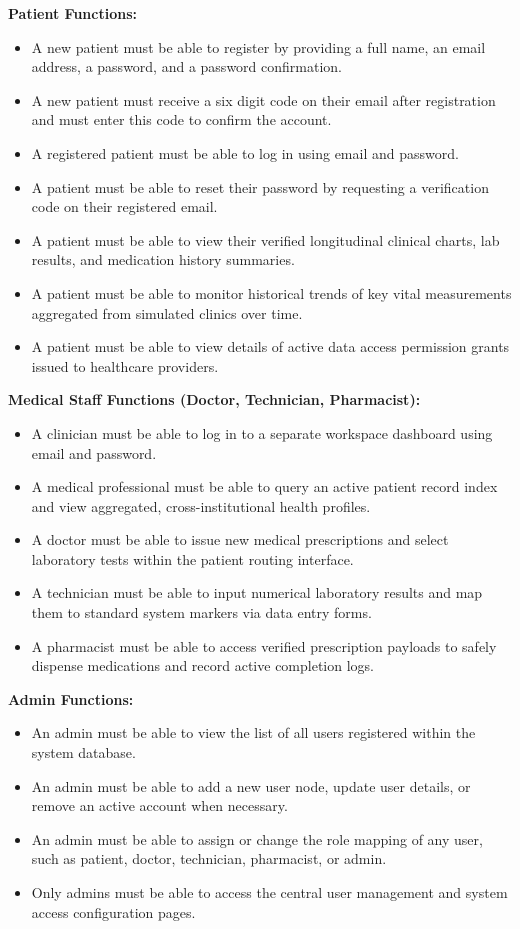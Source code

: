 \documentclass[12pt, a4paper]{report}
\numberwithin{equation}{chapter}
\begin{document}
\noindent \textbf{Patient Functions:}
\begin{itemize}
    \item A new patient must be able to register by providing a full name, an email address, a password, and a password confirmation.
    \item A new patient must receive a six digit code on their email after registration and must enter this code to confirm the account.
    \item A registered patient must be able to log in using email and password.
    \item A patient must be able to reset their password by requesting a verification code on their registered email.
    \item A patient must be able to view their verified longitudinal clinical charts, lab results, and medication history summaries.
    \item A patient must be able to monitor historical trends of key vital measurements aggregated from simulated clinics over time.
    \item A patient must be able to view details of active data access permission grants issued to healthcare providers.
\end{itemize}

\noindent \textbf{Medical Staff Functions (Doctor, Technician, Pharmacist):}
\begin{itemize}
    \item A clinician must be able to log in to a separate workspace dashboard using email and password.
    \item A medical professional must be able to query an active patient record index and view aggregated, cross-institutional health profiles.
    \item A doctor must be able to issue new medical prescriptions and select laboratory tests within the patient routing interface.
    \item A technician must be able to input numerical laboratory results and map them to standard system markers via data entry forms.
    \item A pharmacist must be able to access verified prescription payloads to safely dispense medications and record active completion logs.
\end{itemize}

\noindent \textbf{Admin Functions:}
\begin{itemize}
    \item An admin must be able to view the list of all users registered within the system database.
    \item An admin must be able to add a new user node, update user details, or remove an active account when necessary.
    \item An admin must be able to assign or change the role mapping of any user, such as patient, doctor, technician, pharmacist, or admin.
    \item Only admins must be able to access the central user management and system access configuration pages.
\end{itemize}
\end{document}
